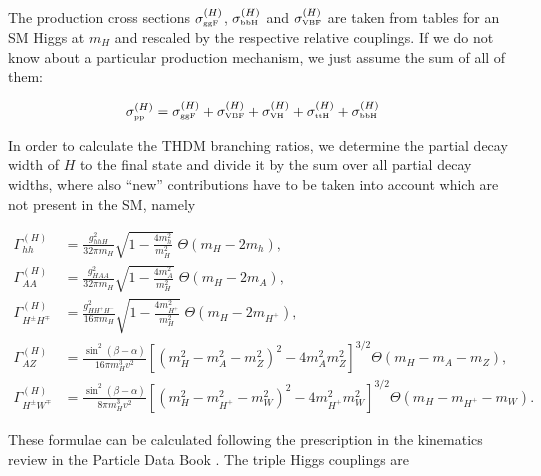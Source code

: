 \documentclass[preprint,3p,12pt]{elsarticle}
\begin{document}
The production cross sections $\sigma ^{(H)}_{\text{\tiny{ggF}}}$, $\sigma ^{(H)}_{\text{\tiny{bbH}}}$ and $\sigma ^{(H)}_{\text{\tiny{VBF}}}$ are taken from tables for an SM Higgs at $m_H$ and rescaled by the respective relative couplings. If we do not know about a particular production mechanism, we just assume the sum of all of them:

\begin{align}
 \sigma ^{(H)}_{\text{\tiny{pp}}} &= \sigma ^{(H)}_{\text{\tiny{ggF}}} + \sigma ^{(H)}_{\text{\tiny{VBF}}} + \sigma ^{(H)}_{\text{\tiny{VH}}} + \sigma ^{(H)}_{\text{\tiny{ttH}}} + \sigma ^{(H)}_{\text{\tiny{bbH}}} \nonumber
\end{align}

In order to calculate the THDM branching ratios, we determine the partial decay width of $H$ to the final state and divide it by the sum over all partial decay widths, where also ``new'' contributions have to be taken into account which are not present in the SM, namely

\begin{align}
 \Gamma ^{(H)}_{hh} &= \frac{g_{hhH}^2}{32 \pi m_H } \sqrt{1 - \frac{4 m_h^2}{m_H^2}} \; \Theta (m_H-2m_h), \nonumber \\
 \Gamma ^{(H)}_{AA} &= \frac{g_{HAA}^2}{32 \pi m_H } \sqrt{1 - \frac{4 m_A^2}{m_H^2}} \; \Theta (m_H-2m_A), \nonumber \\
 \Gamma ^{(H)}_{H^\pm H^\mp} &= \frac{g_{HH^+H^-}^2}{16 \pi m_H } \sqrt{1 - \frac{4 m_{H^+}^2}{m_H^2}} \; \Theta (m_H-2m_{H^+}), \nonumber \\
 \Gamma ^{(H)}_{AZ} &= \frac{\sin^2 (\beta -\alpha )}{16 \pi m_H^3 v^2} \left[ (m_H^2-m_A^2-m_Z^2)^2-4 m_A^2 m_Z^2\right] ^{3/2}  \Theta (m_H-m_A-m_Z), \nonumber \\
 \Gamma ^{(H)}_{H^\pm W^\mp } &= \frac{\sin^2 (\beta -\alpha )}{8 \pi m_H^3 v^2} \left[ (m_H^2-m_{H^+}^2-m_W^2)^2-4 m_{H^+}^2 m_W^2\right] ^{3/2}  \Theta (m_H-m_{H^+}-m_W). \nonumber 
\end{align}

These formulae can be calculated following the prescription in the kinematics review in the Particle Data Book \cite{Agashe:2014kda}. The triple Higgs couplings are
\end{document}
